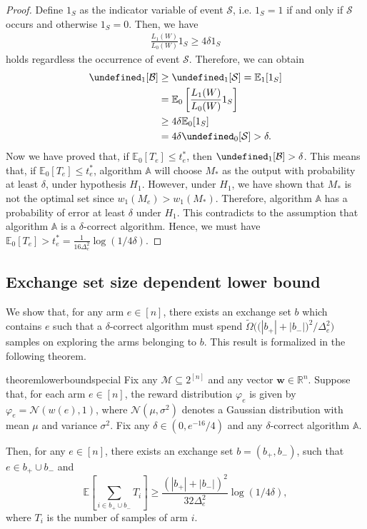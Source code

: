\documentclass{article}
\newcommand{\Rew}{\varphi}
\newcommand{\E}{\mathbb E}
\newcommand{\M}{\mathcal M}
\newcommand{\RR}{\mathbb R}
\newcommand{\Bopt}{\mathcal B_{\mathsf{opt}}}
\let\Pr\undefined
\DeclareMathOperator{\Pr}{Pr}
\renewcommand{\vec}[1]{\boldsymbol{#1}}
\begin{document}
\begin{proof}
Define $1_S$ as the indicator variable of event $\mathcal S$, i.e. $1_S = 1$ if and only if $\mathcal S$ occurs and otherwise $1_S = 0$.
Then, we have
\begin{align*}
\frac{L_1(W)}{L_0(W)} 1_S \ge 4\delta 1_S
\end{align*}
holds regardless the occurrence of event $\mathcal S$.
Therefore, we can obtain
\begin{align*}
\Pr_1[\mathcal B] &\ge \Pr_1[\mathcal S] = \E_1[1_S] \\
				  &= \E_0\left[\frac{L_1(W)}{L_0(W)} 1_S\right] \\
				  &\ge 4\delta \E_0[1_S] \\
				  &= 4\delta \Pr_0[\mathcal S] > \delta.
\end{align*}
Now we have proved that, if $\E_0[T_e] \le t_e^*$, then $\Pr_1[\mathcal B]>\delta$.
This means that, if $\E_0[T_e] \le t_e^*$, algorithm $\mathbb A$ will choose $M_*$ as the output with probability at least $\delta$, under hypothesis $H_1$.
However, under $H_1$, we have shown that $M_*$ is not the optimal set since $w_1(M_e) > w_1(M_*)$.
Therefore, algorithm $\mathbb A$ has a probability of error at least $\delta$ under $H_1$. 
This contradicts to the assumption that algorithm $\mathbb A$ is a $\delta$-correct algorithm.
Hence, we must have $\E_0[T_e] > t_e^* = \frac{1}{16\Delta_e^2}\log(1/4\delta)$.
\end{proof}


\subsection{Exchange set size dependent lower bound}
We show that, for any arm $e\in [n]$, there exists an exchange set $b$ which contains $e$ such that a $\delta$-correct algorithm must spend
$\tilde \Omega\Big(\big(|b_+|+|b_-|\big)^2 / \Delta_e^2 \Big)$ samples on exploring the arms belonging to $b$.
This result is formalized in the following theorem.

\begin{restatable}{theorem}{lowerboundspecial}
Fix any $\M\subseteq 2^{[n]}$ and any vector $\vec w \in \RR^n$.
Suppose that, for each arm $e\in [n]$, the reward distribution $\Rew_e$ is given by $\Rew_e=\mathcal N(w(e),1)$, where $\mathcal N(\mu, \sigma^2)$ denotes a Gaussian distribution with mean $\mu$ and variance $\sigma^2$. 
Fix any $\delta \in (0,e^{-16}/4)$
and any $\delta$-correct algorithm $\mathbb A$.

Then, for any $e\in [n]$, there exists an exchange set $b=(b_+,b_-)$, such that $e\in b_+ \cup b_-$ and
$$
\E\left[\sum_{i\in b_+\cup b_-} T_i\right] \ge \frac{(|b_+|+|b_-|)^2}{32\Delta_e^2}\log(1/4\delta),
$$
where $T_i$ is the number of samples of arm $i$.
\end{restatable}
\end{document}
